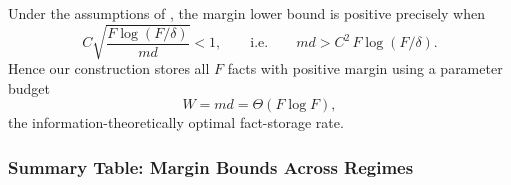 \begin{corollary}\label{cor:optimal-fact-storage-capacity-formal}
Under the assumptions of , the margin lower bound is positive precisely when
\[
C\sqrt{\frac{F\log(F/\delta)}{md}} < 1,
\qquad\text{i.e.}\qquad
md > C^2\,F\log(F/\delta).
\]
Hence our construction stores all $F$ facts with positive margin using a parameter budget
\[
W = md = \Theta\!\left(F\log F\right),
\]
the information-theoretically optimal fact-storage rate.
\end{corollary}

\subsubsection{Summary Table: Margin Bounds Across Regimes}

